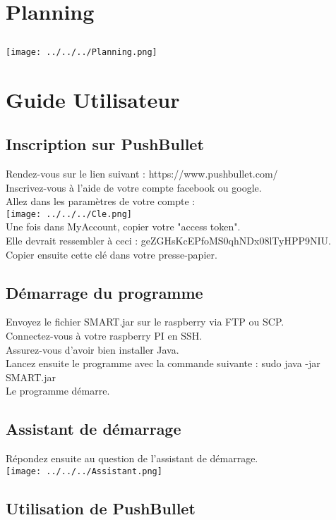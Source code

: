 \documentclass[10pt]{article}
\begin{document}
\section{Planning}
\subsection{}
\texttt{[image: ../../../Planning.png]} 

\section{Guide Utilisateur}
\subsection{Inscription sur PushBullet}
Rendez-vous sur le lien suivant : https://www.pushbullet.com/ \\
Inscrivez-vous à l'aide de votre compte facebook ou google. \\
Allez dans les paramètres de votre compte : \\
\texttt{[image: ../../../Cle.png]} \\
Une fois dans MyAccount, copier votre "access token". \\
Elle devrait ressembler à ceci : geZGHsKcEPfoMS0qhNDx08lTyHPP9NIU. \\
Copier ensuite cette clé dans votre presse-papier. 

\subsection{Démarrage du programme}
Envoyez le fichier SMART.jar sur le raspberry via FTP ou SCP. \\
Connectez-vous à votre raspberry PI en SSH. \\
Assurez-vous d'avoir bien installer Java. \\
Lancez ensuite le programme avec la commande suivante : sudo java -jar SMART.jar \\
Le programme démarre.

\subsection{Assistant de démarrage}
Répondez ensuite au question de l'assistant de démarrage. \\
\texttt{[image: ../../../Assistant.png]} 

\subsection{Utilisation de PushBullet}
\end{document}
